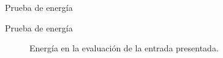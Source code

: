 \documentclass{beamer}
\begin{document}
\begin{frame}{Prueba de energía}
\begin{block}{Prueba de energía}
\begin{figure}[h!]
 \centering
 \caption{Energía en la evaluación de la entrada presentada.}
 \label{Fig:energy}
\end{figure}
\end{block}
\end{frame}
\end{document}

